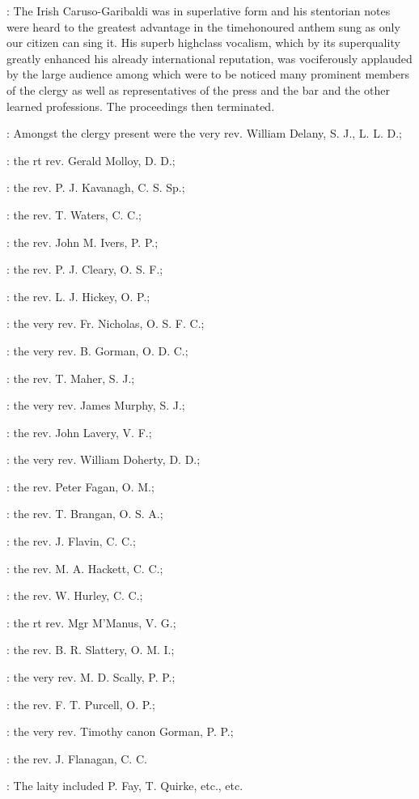 :
The Irish Caruso-Garibaldi
was in superlative form
and his stentorian notes were heard to the
greatest advantage in the timehonoured anthem sung as only our citizen
can sing it. His superb highclass vocalism, which by its superquality
greatly enhanced his already international reputation, was vociferously
applauded by the large audience among which were to be noticed many
prominent members of the clergy as well as representatives of the press
and the bar and the other learned professions. The proceedings then
terminated.

:
Amongst the clergy present were
the very rev. William Delany, S. J., L. L. D.;

:
the rt rev. Gerald Molloy, D. D.;

:
the rev. P. J. Kavanagh, C. S. Sp.;

:
the rev. T. Waters, C. C.; 

:
the rev. John M. Ivers, P. P.; 

:
the rev. P. J. Cleary, O. S. F.; 

:
the rev. L. J. Hickey, O. P.; 

:
the very rev. Fr. Nicholas, O. S. F. C.; 

:
the very rev. B. Gorman, O. D. C.; 

:
the rev. T. Maher, S. J.; 

:
the very rev. James Murphy, S. J.; 

:
the rev. John Lavery, V. F.; 

:
the very rev. William Doherty, D. D.; 

:
the rev. Peter Fagan, O. M.; 

:
the rev. T. Brangan, O. S. A.; 

:
the rev. J. Flavin, C. C.; 

:
the rev. M. A. Hackett, C. C.; 

:
the rev. W. Hurley, C. C.; 

:
the rt rev. Mgr M'Manus, V. G.; 

:
the rev. B. R. Slattery, O. M. I.; 

:
the very rev. M. D. Scally, P. P.; 

:
the rev. F. T. Purcell, O. P.; 

:
the very rev. Timothy canon Gorman, P. P.; 

:
the rev. J. Flanagan, C. C. 

:
The laity included P. Fay, T. Quirke, etc., etc.

